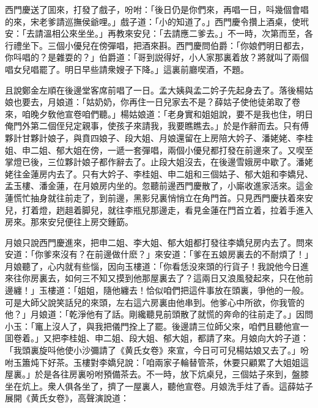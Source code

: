 西門慶送了囬來，打發了戲子，吩咐：「後日仍是你們來，再唱一日，呌幾個會唱的來，宋老爹請巡撫侯爺哩。」戲子道：「小的知道了。」西門慶令攢上酒桌，使玳安：「去請溫相公來坐坐。」再教來安兒：「去請應二爹去。」不一時，次第而至，各行禮坐下。三個小優兒在傍彈唱，把酒來斟。西門慶問伯爵：「你娘們明日都去，你呌唱的？是雜耍的？」伯爵道：「哥到説得好，小人家那裏着放？將就叫了兩個唱女兒唱罷了。明日早些請衆嫂子下降。」這裏前廳喫酒，不題。

且說鄭金左順在後邊堂客席前唱了一日。孟大姨與孟二妗子先起身去了。落後楊姑娘也要去，月娘道：「姑奶奶，你再住一日兒家去不是？薛姑子使他徒弟取了卷來，咱晚夕敎他宣卷咱們聽。」楊姑娘道：「老身實和姐姐說，要不是我也住，明日俺門外第二個侄兒定親事，使孩子來請我，我要瞧瞧去。」於是作辭而去。只有傅夥計甘夥計娘子，與賁四娘子、段大姐、月娘還留在上房陪大妗子、潘姥姥、李桂姐、申二姐、郁大姐在傍，一遞一套彈唱，兩個小優兒都打發在前邊來了。又喫至掌燈已後，三位夥計娘子都作辭去了。止段大姐沒去，在後邊雪娥房中歇了。潘姥姥往金蓮房内去了。只有大妗子、李桂姐、申二姐和三個姑子、郁大姐和李嬌兒、孟玉樓、潘金蓮，在月娘房内坐的。忽聽前邊西門慶散了，小廝收進家活來。這金蓮慌忙抽身就往前走了，到前邊，黑影兒裏悄悄立在角門首。只見西門慶扶着來安兒，打着燈，趔趄着脚兒，就往李瓶兒那邊走，看見金蓮在門首立着，拉着手進入房來。那來安兒便往上房交鍾筯。

月娘只說西門慶進來，把申二姐、李大姐、郁大姐都打發往李嬌兒房内去了。問來安道：「你爹來沒有？在前邊做什麽？」來安道：「爹在五娘房裏去的不耐煩了！」月娘聽了，心内就有些惱，因向玉樓道：「你看恁没來頭的行貨子！我說他今日進來往你房裏去，如何三不知又摸到他那屋裏去了？這兩日又浪風發起來，只在他前邊纏！」玉樓道：「姐姐，隨他纏去！恰似咱們把這件事放在頭裏，爭他的一般。可是大師父說笑話兒的來頭，左右這六房裏由他串到。他爹心中所欲，你我管的他？」月娘道：「乾淨他有了話。剛纔聽見前頭散了就慌的奔命的往前走了。」因問小玉：「竃上沒人了，與我把儀門拴上了罷。後邊請三位師父來，咱們且聽他宣一囬卷着。」又把李桂姐、申二姐、段大姐、郁大姐，都請了來。月娘向大妗子道：「我頭裏旋呌他使小沙彌請了《黄氏女卷》來宣，今日可可兒楊姑娘又去了。」吩咐玉簫炖下好茶。玉樓對李嬌兒說：「咱兩家子輪替管茶，休要只顧累了大姐姐這屋裏。」於是各往房裏吩咐預備茶去。不一時，放下炕桌兒，三個姑子來到，盤膝坐在炕上。衆人俱各坐了，擠了一屋裏人，聽他宣卷。月娘洗手炷了香。這薛姑子展開《黄氏女卷》，高聲演說道：

